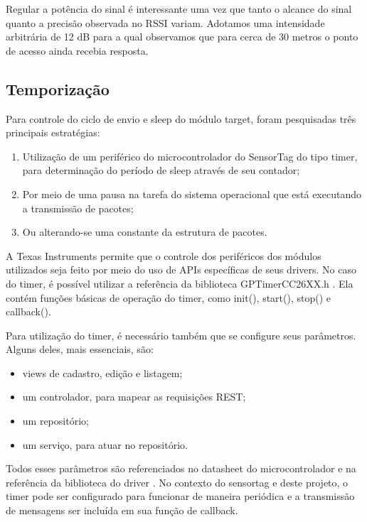 Regular a potência do sinal é interessante uma vez que tanto o alcance do sinal quanto a precisão observada no RSSI variam. Adotamos uma intensidade arbitrária de 12 dB para a qual observamos que para cerca de 30 metros o ponto de acesso ainda recebia resposta.

\subsection{Temporização}

Para controle do ciclo de envio e sleep do módulo target, foram pesquisadas três principais estratégias:

\begin{enumerate}
  \item Utilização de um periférico do microcontrolador do SensorTag do tipo timer, para determinação do período de sleep através de seu contador;
  \item Por meio de uma pausa na tarefa do sistema operacional que está executando a transmissão de pacotes;
  \item Ou alterando-se uma constante da estrutura de pacotes.
\end{enumerate}

A Texas Instruments permite que o controle dos periféricos dos módulos utilizados seja feito por meio do uso de APIs específicas de seus drivers. No caso do timer, é possível utilizar a referência da biblioteca GPTimerCC26XX.h \cite{gptimer}. Ela contém funções básicas de operação do timer, como init(), start(), stop() e callback().

Para utilização do timer, é necessário também que se configure seus parâmetros. Alguns deles, mais essenciais, são:

\begin{itemize}
	\item views de cadastro, edição e listagem;
	\item um controlador, para mapear as requisições REST;
	\item um repositório;
	\item um serviço, para atuar no repositório.
\end{itemize}

Todos esses parâmetros são referenciados no datasheet do microcontrolador \cite{datasheet} e na referência da biblioteca do driver \cite{gptimer}. No contexto do sensortag e deste projeto, o timer pode ser configurado para funcionar de maneira periódica e a transmissão de mensagens ser incluída em sua função de callback.


